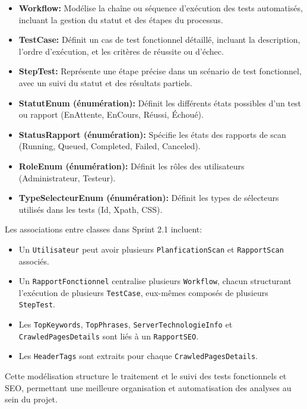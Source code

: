 \begin{itemize}[label=$*$]
        \item \textbf{Workflow:} Modélise la chaîne ou séquence d'exécution des tests automatisés, incluant la gestion du statut et des étapes du processus.
        
        \item \textbf{TestCase:} Définit un cas de test fonctionnel détaillé, incluant la description, l'ordre d'exécution, et les critères de réussite ou d'échec.
        
        \item \textbf{StepTest:} Représente une étape précise dans un scénario de test fonctionnel, avec un suivi du statut et des résultats partiels.
                
        \item \textbf{StatutEnum (énumération):} Définit les différents états possibles d'un test ou rapport (EnAttente, EnCours, Réussi, Échoué).
        
        \item \textbf{StatusRapport (énumération):} Spécifie les états des rapports de scan (Running, Queued, Completed, Failed, Canceled).
        
        \item \textbf{RoleEnum (énumération):} Définit les rôles des utilisateurs (Administrateur, Testeur).
        
        \item \textbf{TypeSelecteurEnum (énumération):} Définit les types de sélecteurs utilisés dans les tests (Id, Xpath, CSS).
    \end{itemize}
    Les associations entre classes dans Sprint 2.1 incluent:
    \begin{itemize}[label=$-$]
        \item Un \texttt{Utilisateur} peut avoir plusieurs \texttt{PlanficationScan} et \texttt{RapportScan} associés.
        \item Un \texttt{RapportFonctionnel} centralise plusieurs \texttt{Workflow}, chacun structurant l'exécution de plusieurs \texttt{TestCase}, eux-mêmes composés de plusieurs \texttt{StepTest}.
        \item Les \texttt{TopKeywords}, \texttt{TopPhrases}, \texttt{ServerTechnologieInfo} et \texttt{CrawledPagesDetails} sont liés à un \texttt{RapportSEO}.
        \item Les \texttt{HeaderTags} sont extraits pour chaque \texttt{CrawledPagesDetails}.
    \end{itemize}
    Cette modélisation structure le traitement et le suivi des tests fonctionnels et SEO, permettant une meilleure organisation et automatisation des analyses au sein du projet.



